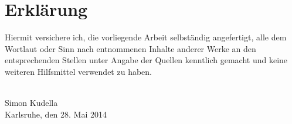 
\chapter*{Erkl\"arung}
\thispagestyle{empty}
Hiermit versichere ich, die vorliegende Arbeit selbst\"andig angefertigt, alle dem Wortlaut oder Sinn nach entnommenen Inhalte anderer Werke an den entsprechenden Stellen unter Angabe der Quellen kenntlich gemacht und keine weiteren Hilfsmittel verwendet zu haben.
\\
\\
\begin{flushright}

Simon Kudella \\
Karlsruhe, den 28. Mai 2014

\end{flushright}

\cleardoublepage
\thispagestyle{empty}
